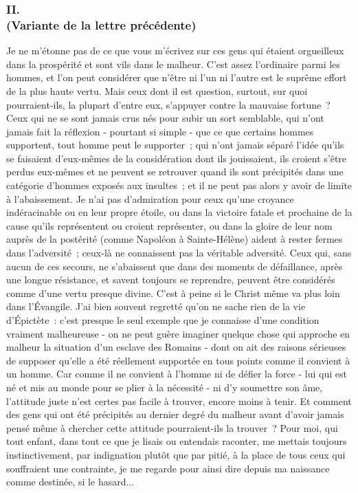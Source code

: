 \documentclass[french,twoside]{book} %
\begin{document}
\subsubsection[{II. (Variante de la lettre précédente)}]{II. \\
(Variante de la lettre précédente)}
\noindent Je ne m'étonne pas de ce que vous m'écrivez sur ces gens qui étaient orgueilleux dans la prospérité et sont vils dans le malheur. C'est assez l'ordi­naire parmi les hommes, et l'on peut considérer que n'être ni l'un ni l'autre est le suprême effort de la plus haute vertu. Mais ceux dont il est question, surtout, sur quoi pourraient-ils, la plupart d'entre eux, s'appuyer contre la mauvaise fortune ? Ceux qui ne se sont jamais crus nés pour subir un sort semblable, qui n'ont jamais fait la réflexion - pourtant si simple - que ce que certains hommes supportent, tout homme peut le supporter ; qui n'ont jamais séparé l'idée qu'ils se faisaient d'eux-mêmes de la considération dont ils jouissaient, ils croient s'être perdus eux-mêmes et ne peuvent se retrouver quand ils sont précipités dans une catégorie d'hommes exposés aux insultes ; et il ne peut pas alors y avoir de limite à l'abaissement. Je n'ai pas d'admiration pour ceux qu'une croyance indéracinable ou en leur propre étoile, ou dans la victoire fatale et prochaine de la cause qu'ils représentent ou croient représen­ter, ou dans la gloire de leur nom auprès de la postérité (comme Napoléon à Sainte-Hélène) aident à rester fermes dans l'adversité ; ceux-là ne connaissent pas la véritable adversité. Ceux qui, sans aucun de ces secours, ne s'abaissent que dans des moments de défaillance, après une longue résistance, et savent toujours se reprendre, peuvent être considérés comme d'une vertu presque divine. C'est à peine si le Christ même va plus loin dans l'Évangile. J'ai bien souvent regretté qu'on ne sache rien de la vie d'Épictète : c'est presque le seul exemple que je connaisse d'une condition vraiment malheureuse - on ne peut guère imaginer quelque chose qui approche en malheur la situation d'un esclave des Romains - dont on ait des raisons sérieuses de supposer qu'elle a été réellement supportée en tous points comme il convient à un homme. Car comme il ne convient à l'homme ni de défier la force - lui qui est né et mis au monde pour se plier à la nécessité - ni d'y soumettre son âme, l'attitude juste n'est certes pas facile à trouver, encore moins à tenir. Et comment des gens qui ont été précipités au dernier degré du malheur avant d'avoir jamais pensé même à chercher cette attitude pourraient-ils la trouver ? Pour moi, qui tout enfant, dans tout ce que je lisais ou entendais raconter, me mettais toujours instinctivement, par indignation plutôt que par pitié, à la place de tous ceux qui souffraient une contrainte, je me regarde pour ainsi dire depuis ma nais­sance comme destinée, si le hasard...
\end{document}
